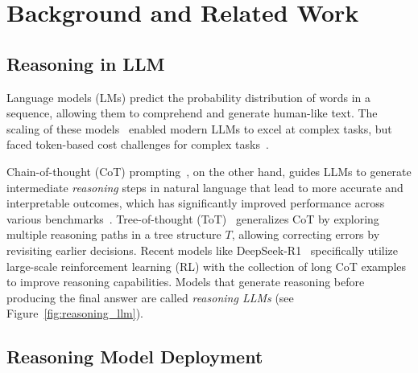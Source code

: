 \section{Background and Related Work}
\renewcommand\thefootnote{}%


\subsection{Reasoning in LLM}
Language models (LMs) predict the probability distribution of words in a sequence, allowing them to comprehend and generate human-like text. The scaling of these models~\citep{merity2016pointer, devlin2018bert, brown2020language, mehta2023empirical, zhao2023survey} enabled modern LLMs to excel at complex tasks, but faced token-based cost challenges for complex tasks~\citep{liao2024attention, han2024token,wang-etal-2024-reasoning-token}.

Chain-of-thought (CoT) prompting~\citep{wei2022chain, kojima2022large}, on the other hand, guides LLMs to generate intermediate \emph{reasoning} steps in natural language that lead to more accurate and interpretable outcomes, which has significantly improved performance across various benchmarks~\citep{sun2023survey}. Tree-of-thought (ToT)~\citep{yao2024tree} generalizes CoT by exploring multiple reasoning paths in a tree structure $T$, allowing correcting errors by revisiting earlier decisions. Recent models like DeepSeek-R1~\citep{guo2025deepseek} specifically utilize large-scale reinforcement learning (RL) with the collection of long CoT examples to improve reasoning capabilities. Models that generate reasoning before producing the final answer are  called \textit{reasoning LLMs} (see Figure~\ref{fig:reasoning_llm}). 






















\subsection{Reasoning Model Deployment}

